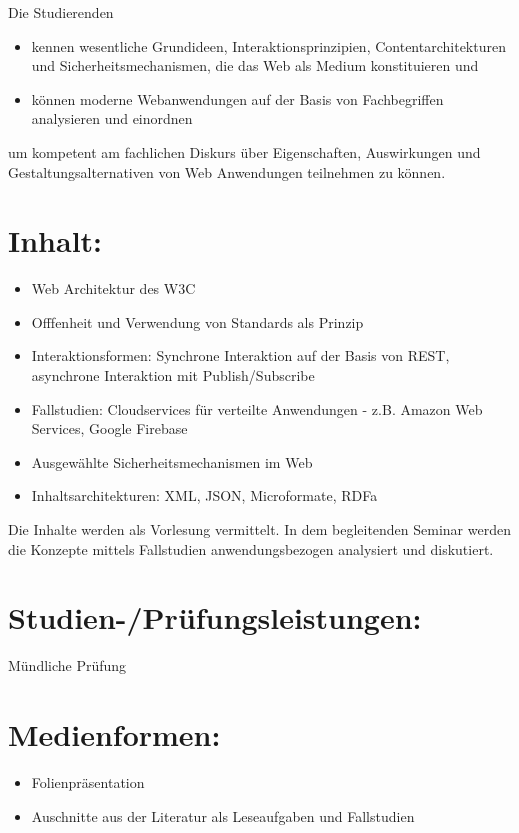 Die Studierenden

\begin{itemize}
\tightlist
\item
  kennen wesentliche Grundideen, Interaktionsprinzipien,
  Contentarchitekturen und Sicherheitsmechanismen, die das Web als
  Medium konstituieren und
\item
  können moderne Webanwendungen auf der Basis von Fachbegriffen
  analysieren und einordnen
\end{itemize}

um kompetent am fachlichen Diskurs über Eigenschaften, Auswirkungen und
Gestaltungsalternativen von Web Anwendungen teilnehmen zu können.

\section*{Inhalt:}\label{inhalt-11}

\begin{itemize}
\tightlist
\item
  Web Architektur des W3C
\item
  Offfenheit und Verwendung von Standards als Prinzip
\item
  Interaktionsformen: Synchrone Interaktion auf der Basis von REST,
  asynchrone Interaktion mit Publish/Subscribe
\item
  Fallstudien: Cloudservices für verteilte Anwendungen - z.B. Amazon Web
  Services, Google Firebase
\item
  Ausgewählte Sicherheitsmechanismen im Web
\item
  Inhaltsarchitekturen: XML, JSON, Microformate, RDFa
\end{itemize}

Die Inhalte werden als Vorlesung vermittelt. In dem begleitenden Seminar
werden die Konzepte mittels Fallstudien anwendungsbezogen analysiert und
diskutiert.

\section*{Studien-/Prüfungsleistungen:}\label{studien-pruxfcfungsleistungen-10}

Mündliche Prüfung

\section*{Medienformen:}\label{medienformen-6}

\begin{itemize}
\tightlist
\item
  Folienpräsentation
\item
  Auschnitte aus der Literatur als Leseaufgaben und Fallstudien
\end{itemize}

